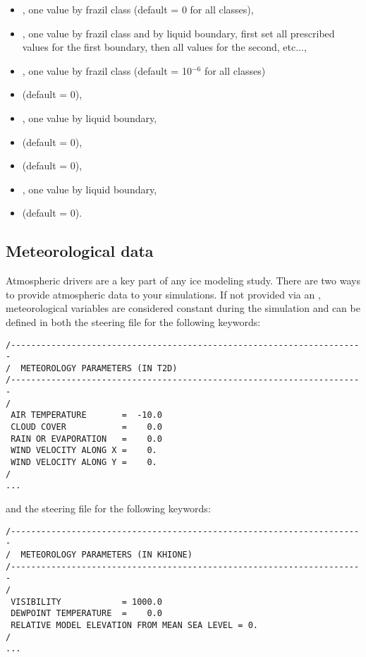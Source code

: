 \begin{itemize}
  \item {}, one value by frazil class (default = 0 for all classes),
  \item {}, one value by frazil class and by liquid boundary, first set all prescribed values for the first boundary, then all values for the second, etc...,
  \item {}, one value by frazil class (default = 10$^{-6}$ for all classes)
  \item {} (default = 0),
  \item {}, one value by liquid boundary,
  \item {} (default = 0),
  \item {} (default = 0),
  \item {}, one value by liquid boundary,
  \item {} (default = 0).
\end{itemize}


\subsection{Meteorological data}

Atmospheric drivers are a key part of any ice modeling study.
There are two ways to provide atmospheric data to your simulations.
If not provided via an ,
meteorological variables are considered constant during the simulation and can be defined in
both the  steering file for the following keywords:
\lstset{language=TelemacCas,
        basicstyle=\scriptsize\ttfamily}
\begin{lstlisting}
/----------------------------------------------------------------------
/  METEOROLOGY PARAMETERS (IN T2D)
/----------------------------------------------------------------------
/
 AIR TEMPERATURE       =  -10.0
 CLOUD COVER           =    0.0
 RAIN OR EVAPORATION   =    0.0
 WIND VELOCITY ALONG X =    0.
 WIND VELOCITY ALONG Y =    0.
/
...
\end{lstlisting}
and the \khione steering file for the following keywords:
\lstset{language=TelemacCas,
        basicstyle=\scriptsize\ttfamily}
\begin{lstlisting}
/----------------------------------------------------------------------
/  METEOROLOGY PARAMETERS (IN KHIONE)
/----------------------------------------------------------------------
/
 VISIBILITY            = 1000.0
 DEWPOINT TEMPERATURE  =    0.0
 RELATIVE MODEL ELEVATION FROM MEAN SEA LEVEL = 0.
/
...
\end{lstlisting}


